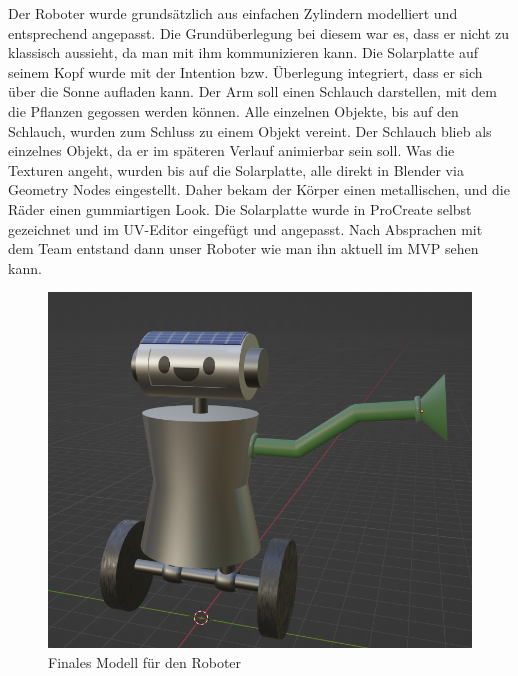 Der Roboter wurde grundsätzlich aus einfachen Zylindern modelliert und entsprechend angepasst. Die Grundüberlegung bei diesem war es, dass er nicht zu klassisch aussieht, da man mit ihm kommunizieren kann. Die Solarplatte auf seinem Kopf wurde mit der Intention bzw. Überlegung integriert, dass er sich über die Sonne aufladen kann. Der Arm soll einen Schlauch darstellen, mit dem die Pflanzen gegossen werden können. Alle einzelnen Objekte, bis auf den Schlauch, wurden zum Schluss zu einem Objekt vereint. Der Schlauch blieb als einzelnes Objekt, da er im späteren Verlauf animierbar sein soll. Was die Texturen angeht, wurden bis auf die Solarplatte, alle direkt in Blender via Geometry Nodes eingestellt. Daher bekam der Körper einen metallischen, und die Räder einen gummiartigen Look. Die Solarplatte wurde in ProCreate selbst gezeichnet und im UV-Editor eingefügt und angepasst. Nach Absprachen mit dem Team entstand dann unser Roboter wie man ihn aktuell im MVP sehen kann.
\begin{figure}[h]
	\centering
	\includegraphics[height=0.3\pageheight,keepaspectratio]{pics/10}
	\caption{Finales Modell für den Roboter}
\end{figure}
\par

